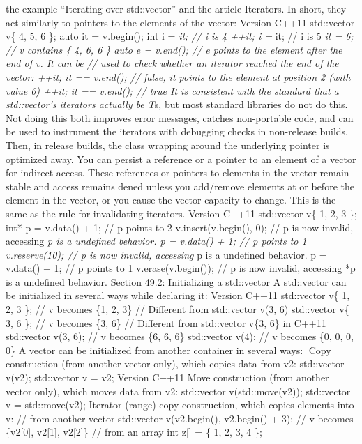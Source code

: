 the example ``Iterating over std::vector'' and the article Iterators. In
short, they act similarly to pointers to the elements of the vector:
Version C++11 std::vector v\{ 4, 5, 6 \}; auto it = v.begin(); int i =
\emph{it; // i is 4 ++it; i = }it; // i is 5 \emph{it = 6; // v contains
\{ 4, 6, 6 \} auto e = v.end(); // e points to the element after the end
of v. It can be // used to check whether an iterator reached the end of
the vector: ++it; it == v.end(); // false, it points to the element at
position 2 (with value 6) ++it; it == v.end(); // true It is consistent
with the standard that a std::vector's iterators actually be T}s, but
most standard libraries do not do this. Not doing this both improves
error messages, catches non-portable code, and can be used to instrument
the iterators with debugging checks in non-release builds. Then, in
release builds, the class wrapping around the underlying pointer is
optimized away. You can persist a reference or a pointer to an element
of a vector for indirect access. These references or pointers to
elements in the vector remain stable and access remains dened unless you
add/remove elements at or before the element in the vector, or you cause
the vector capacity to change. This is the same as the rule for
invalidating iterators. Version C++11 std::vector v\{ 1, 2, 3 \}; int* p
= v.data() + 1; // p points to 2 v.insert(v.begin(), 0); // p is now
invalid, accessing \emph{p is a undefined behavior. p = v.data() + 1; //
p points to 1 v.reserve(10); // p is now invalid, accessing }p is a
undefined behavior. p = v.data() + 1; // p points to 1
v.erase(v.begin()); // p is now invalid, accessing *p is a undefined
behavior. Section 49.2: Initializing a std::vector A std::vector can be
initialized in several ways while declaring it: Version C++11
std::vector v\{ 1, 2, 3 \}; // v becomes \{1, 2, 3\} // Different from
std::vector v(3, 6) std::vector v\{ 3, 6 \}; // v becomes \{3, 6\} //
Different from std::vector v\{3, 6\} in C++11 std::vector v(3, 6); // v
becomes \{6, 6, 6\} std::vector v(4); // v becomes \{0, 0, 0, 0\} A
vector can be initialized from another container in several ways: Copy
construction (from another vector only), which copies data from v2:
std::vector v(v2); std::vector v = v2; Version C++11 Move construction
(from another vector only), which moves data from v2: std::vector
v(std::move(v2)); std::vector v = std::move(v2); Iterator (range)
copy-construction, which copies elements into v: // from another vector
std::vector v(v2.begin(), v2.begin() + 3); // v becomes \{v2{[}0{]},
v2{[}1{]}, v2{[}2{]}\} // from an array int z{[}{]} = \{ 1, 2, 3, 4 \};
